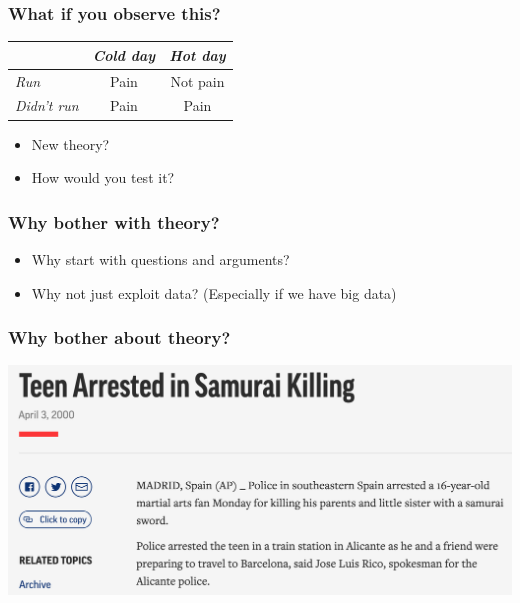 \documentclass[aspectratio=43]{beamer}
\begin{document}
\begin{frame}
\frametitle{What if you observe this?}
\centering

\begin{tabular}{|l|c|c|}
\toprule
            & \textit{Cold day} & \textit{Hot day} \\
\midrule
\textit{Run}         & Pain & Not pain \\
\midrule
\textit{Didn't run}  & Pain & Pain \\
\bottomrule
\end{tabular}

\vspace{20pt}

\begin{itemize}
  \item New theory?
  \item How would you test it?
\end{itemize}

\end{frame}

\begin{frame}
\frametitle{Why bother with theory?}
\centering

\begin{itemize}
  \item Why start with questions and arguments?
  \item[] Why not just exploit data? (Especially if we have big data)
\end{itemize}

\end{frame}

\begin{frame}
\frametitle{Why bother about theory?}
\centering

\includegraphics[width = \textwidth]{../img/katana}

\end{frame}
\end{document}
